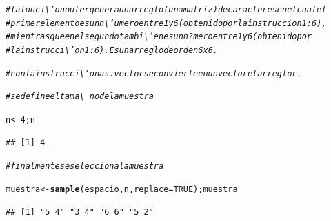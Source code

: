 \documentclass[12pt,letterpaper]{article}\usepackage[]{graphicx}\usepackage[]{color}
\makeatletter
\newcommand{\hlnum}[1]{\textcolor[rgb]{0.686,0.059,0.569}{#1}}%
\newcommand{\hlcom}[1]{\textcolor[rgb]{0.678,0.584,0.686}{\textit{#1}}}%
\newcommand{\hlstd}[1]{\textcolor[rgb]{0.345,0.345,0.345}{#1}}%
\newcommand{\hlkwb}[1]{\textcolor[rgb]{0.69,0.353,0.396}{#1}}%
\newcommand{\hlkwc}[1]{\textcolor[rgb]{0.333,0.667,0.333}{#1}}%
\newcommand{\hlkwd}[1]{\textcolor[rgb]{0.737,0.353,0.396}{\textbf{#1}}}%
\newenvironment{kframe}{%
 \def\at@end@of@kframe{}%
 \ifinner\ifhmode%
  \def\at@end@of@kframe{\end{minipage}}%
  \begin{minipage}{\columnwidth}%
 \fi\fi%
 \def\FrameCommand##1{\hskip\@totalleftmargin \hskip-\fboxsep
 \colorbox{shadecolor}{##1}\hskip-\fboxsep
     \hskip-\linewidth \hskip-\@totalleftmargin \hskip\columnwidth}%
 \MakeFramed {\advance\hsize-\width
   \@totalleftmargin\z@ \linewidth\hsize
   \@setminipage}}%
 {\par\unskip\endMakeFramed%
 \at@end@of@kframe}
\newenvironment{knitrout}{}{} %
\makeatother
\begin{document}
\begin{enumerate}
\begin{knitrout}
\color{fgcolor}\begin{kframe}
\begin{alltt}
\hlcom{# la funci\textbackslash{}'on outer genera un arreglo (una matriz) decaracteres en el cual el }
\hlcom{# primer elemento es un n\textbackslash{}'umero entre 1 y 6 (obtenido por la instruccion 1:6),}
\hlcom{# mientras que en el segundo tambi\textbackslash{}'en es un n?mero entre 1 y 6 (obtenido por }
\hlcom{# la instrucci\textbackslash{}'on 1:6). Es un arreglo de orden 6 x 6. }
\end{alltt}
\end{kframe}
\end{knitrout}

\begin{knitrout}
\color{fgcolor}\begin{kframe}
\begin{alltt}
\hlcom{# con la instrucci\textbackslash{}'on as.vector se convierte en un vector el arreglor. }
\end{alltt}
\end{kframe}
\end{knitrout}

\begin{knitrout}
\color{fgcolor}\begin{kframe}
\begin{alltt}
\hlcom{# se define el tama\textbackslash{}~no de la muestra}

\hlstd{n} \hlkwb{<-} \hlnum{4}\hlstd{; n}
\end{alltt}
\begin{verbatim}
## [1] 4
\end{verbatim}
\end{kframe}
\end{knitrout}

\begin{knitrout}
\color{fgcolor}\begin{kframe}
\begin{alltt}
\hlcom{# finalmente se selecciona la muestra }

\hlstd{muestra} \hlkwb{<-} \hlkwd{sample}\hlstd{(espacio, n,} \hlkwc{replace}\hlstd{=}\hlnum{TRUE}\hlstd{); muestra}
\end{alltt}
\begin{verbatim}
## [1] "5 4" "3 4" "6 6" "5 2"
\end{verbatim}
\end{kframe}
\end{knitrout}


\end{enumerate}
\end{document}
